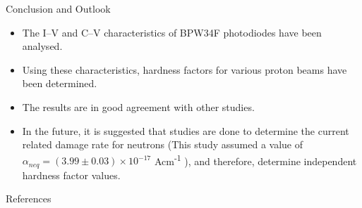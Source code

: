 \documentclass{beamer}
\begin{document}
\begin{frame}{Conclusion and Outlook}
  \begin{itemize}
  \item The I--V and C--V characteristics of BPW34F photodiodes have been analysed.
  \vspace{0.3cm}
  \item Using these characteristics, hardness factors for various proton beams have been determined.
  \vspace{0.3cm}
  \item The results are in good agreement with other studies.
  \vspace{0.3cm}
  \item In the future, it is suggested that studies are done to determine the current related damage rate for neutrons (This study assumed a value of $\alpha _{neq} = (3.99 \pm 0.03)\times 10^{-17}$ Acm\textsuperscript{-1} \textsuperscript{\cite{Moll}}), and therefore, determine independent hardness factor values.
  \end{itemize}    
\end{frame}

\begin{frame}[allowframebreaks]{References}
    \printbibliography[heading=none]
\end{frame}
\end{document}
